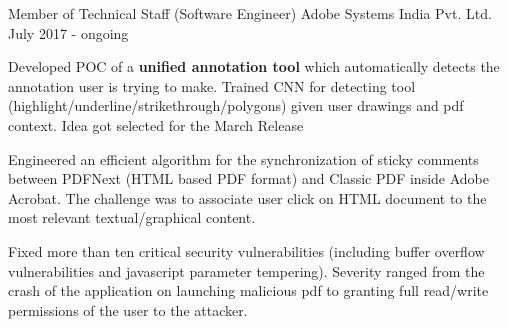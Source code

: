 

\begin{cventries}

  \cventry
   {Member of Technical Staff (Software Engineer)} %
   {Adobe Systems India Pvt. Ltd.} %
   {July 2017 - ongoing} %
   {} %
   {
   	\begin{cvitems}
   		\item {
	   		Developed POC of a \textbf{unified annotation tool} which automatically detects the annotation user is trying to make. Trained CNN for detecting tool (highlight/underline/strikethrough/polygons) given user drawings and pdf context. Idea got selected for the March Release
   		}
   		\item {Engineered an efficient algorithm for the synchronization of sticky comments between PDFNext (HTML based PDF format) and Classic PDF inside Adobe Acrobat. The challenge was to associate user click on HTML document to the most relevant textual/graphical content.}
   		\item {Fixed more than ten critical security vulnerabilities (including buffer overflow vulnerabilities and javascript parameter tempering). Severity ranged from the crash of the application on launching malicious pdf to granting full read/write permissions of the user to the attacker.}
   	\end{cvitems}
   }
   

\end{cventries}
